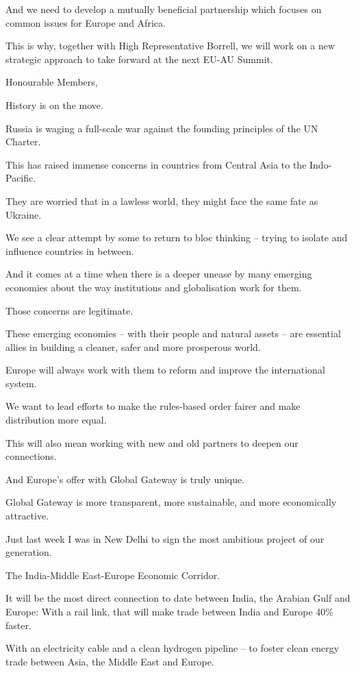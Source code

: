 \documentclass[a4paper,11pt]{article}
\begin{document}
And we need to develop a mutually beneficial partnership which focuses on common issues for Europe and Africa.

This is why, together with High Representative Borrell, we will work on a new strategic approach to take forward at the next EU-AU Summit. 

 

Honourable Members,

History is on the move.

Russia is waging a full-scale war against the founding principles of the UN Charter.

This has raised immense concerns in countries from Central Asia to the Indo-Pacific.

They are worried that in a lawless world, they might face the same fate as Ukraine.

We see a clear attempt by some to return to bloc thinking – trying to isolate and influence countries in between.

And it comes at a time when there is a deeper unease by many emerging economies about the way institutions and globalisation work for them.

Those concerns are legitimate.

These emerging economies – with their people and natural assets – are essential allies in building a cleaner, safer and more prosperous world.

Europe will always work with them to reform and improve the international system.

We want to lead efforts to make the rules-based order fairer and make distribution more equal.

This will also mean working with new and old partners to deepen our connections.

And Europe's offer with Global Gateway is truly unique.

Global Gateway is more transparent, more sustainable, and more economically attractive.

Just last week I was in New Delhi to sign the most ambitious project of our generation.

The India-Middle East-Europe Economic Corridor.

It will be the most direct connection to date between India, the Arabian Gulf and Europe: With a rail link, that will make trade between India and Europe 40\% faster.

With an electricity cable and a clean hydrogen pipeline – to foster clean energy trade between Asia, the Middle East and Europe.
\end{document}
